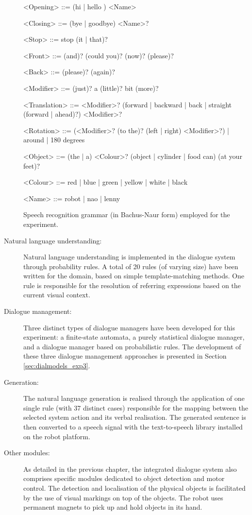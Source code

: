 \begin{description}
\begin{table}[p!]
\begin{grammar}
<Opening> ::= (hi | hello ) <Name>

<Closing> ::= (bye | goodbye) <Name>?

<Stop> ::= stop (it | that)?
 
<Front> ::= (and)? (could you)? (now)? (please)?

<Back> ::= (please)? (again)?

<Modifier> ::= (just)? a (little)? bit (more)? 

<Translation> ::= <Modifier>? (forward | backward | back | straight (forward | ahead)?) <Modifier>?

<Rotation> ::= (<Modifier>? (to the)? (left | right) <Modifier>?) | around | 180 degrees

<Object> ::= (the | a) <Colour>? (object | cylinder | food can) (at your feet)? 

<Colour> ::= red | blue | green | yellow | white | black 

<Name> ::= robot | nao | lenny

\end{grammar}
\caption{Speech recognition grammar (in Bachus-Naur form) employed for the experiment.}
\label{table:asr}
\end{table}

\item[Natural language understanding: ] Natural language understanding is implemented in the dialogue system through probability rules.  A total of 20 rules (of varying size) have been written for the domain, based on simple template-matching methods. One rule is responsible for the resolution of referring expressions based on the current visual context. 

\item[Dialogue management: ] Three distinct types of dialogue managers have been developed for this experiment: a finite-state automata, a purely statistical dialogue manager, and a dialogue manager based on probabilistic rules.  The development of these three dialogue management approaches is presented in Section \ref{sec:dialmodels_exp3}. 

\item[Generation: ] The natural language generation is realised through the application of one single rule (with 37 distinct cases) responsible for the mapping between the selected system action and its verbal realisation. The generated sentence is then converted to a speech signal with the text-to-speech library installed on the robot platform.

\item [Other modules: ] As detailed in the previous chapter, the integrated dialogue system also comprises specific modules dedicated to object detection and motor control.  The detection and localisation of the physical objects is facilitated by the use of visual markings on top of the objects.  The robot uses permanent magnets to pick up and hold objects in its hand. 

\end{description}

